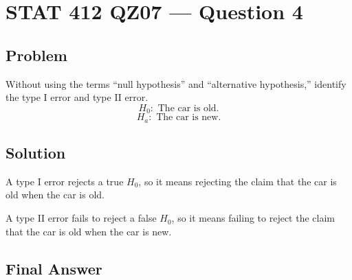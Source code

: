 \documentclass[11pt]{article}
\begin{document}
\section*{STAT 412 QZ07 --- Question 4}

\subsection*{Problem}

Without using the terms ``null hypothesis'' and ``alternative hypothesis,'' identify the type I error and type II error.
\[
H_0:\text{ The car is old.}
\]
\[
H_a:\text{ The car is new.}
\]

\subsection*{Solution}

A type I error rejects a true $H_0$, so it means rejecting the claim that the car is old when the car is old.

A type II error fails to reject a false $H_0$, so it means failing to reject the claim that the car is old when the car is new.

\subsection*{Final Answer}

\end{document}
